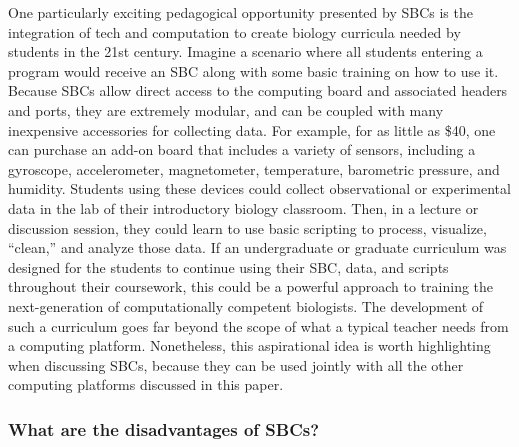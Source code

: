 One particularly exciting pedagogical opportunity presented by SBCs is
the integration of tech and computation to create biology curricula needed by
students in the 21st century.
Imagine a scenario where all students entering a program would receive an SBC
along with some basic training on how to use it.
Because SBCs allow direct access to the computing board and
associated headers and ports, they are extremely modular, and can be coupled
with many inexpensive accessories for collecting data.
For example, for as little as \$40, one can purchase an add-on board that
includes a variety of sensors, including a gyroscope, accelerometer,
magnetometer, temperature, barometric pressure, and humidity.
Students using these devices could collect observational or
experimental data in the lab of their introductory biology classroom.
Then, in a lecture or discussion session, they could learn to use basic
scripting to process, visualize, ``clean,'' and analyze those data.
If an undergraduate or graduate curriculum was designed for the students to
continue using their SBC, data, and scripts throughout their coursework, this
could be a powerful approach to training the next-generation of computationally
competent biologists.
The development of such a curriculum goes far beyond the scope of what a
typical teacher needs from a computing platform.
Nonetheless, this aspirational idea is worth highlighting when discussing
SBCs, because they can be used jointly with all the other computing platforms
discussed in this paper.


{}

\subsubsection{What are the disadvantages of SBCs?}


